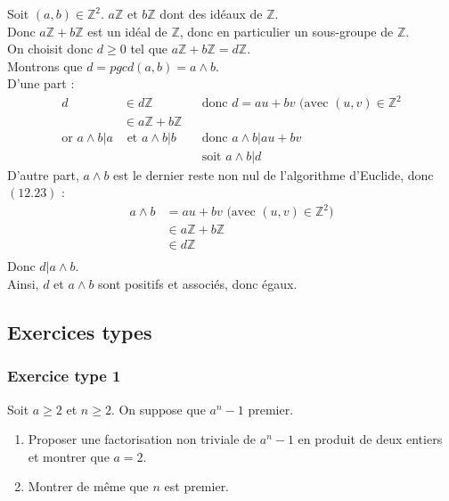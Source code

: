 \documentclass[titlepage, twoside]{report}
\begin{document}
\noindent Soit $(a,b) \in \mathbb{Z}^2$. $a \mathbb{Z} \text{ et } b \mathbb{Z}$ dont des idéaux de $\mathbb{Z}$. \\
Donc $a \mathbb{Z} + b \mathbb{Z}$ est un idéal de $\mathbb{Z}$, donc en particulier un sous-groupe de $\mathbb{Z}$. \\
On choisit donc $d \geq 0$ tel que $a \mathbb{Z} + b \mathbb{Z} = d \mathbb{Z}$. \\
Montrons que $d = pgcd(a,b) = a \wedge b$. \\
D'une part : 
\begin{align*}
    d &\in d \mathbb{Z} && \text{donc } d = au + bv \text{ (avec $(u, v) \in \mathbb{Z}^2$} \\
    &\in a \mathbb{Z} + b \mathbb{Z} \\
    \text{or } a \wedge b | a &\text{ et } a \wedge b | b && \text{donc } a \wedge b | au + bv \\
    & && \text{soit } a \wedge b | d
\end{align*}
D'autre part, $a \wedge b$ est le dernier reste non nul de l'algorithme d'Euclide, donc $(\text{12.23})$ :
\begin{align*}
    a \wedge b &= au + bv \text{ (avec $(u, v) \in \mathbb{Z}^2$)} \\
    &\in a \mathbb{Z} + b \mathbb{Z} \\
    &\in d \mathbb{Z} \\
\end{align*}
Donc $d | a \wedge b$. \\
Ainsi, $d$ et $a \wedge b$ sont positifs et associés, donc égaux.


\subsection{Exercices types}
\subsubsection{Exercice type 1}
\begin{tcolorbox}[title=Exercice 1, title filled=false, colframe=darkgreen, colback=darkgreen!10!white]
    Soit $a \geq 2$ et $n \geq 2$. On suppose que $a^n-1$ premier.
    \begin{enumerate}
        \item Proposer une factorisation non triviale de $a^n-1$ en produit de deux entiers et montrer que $a=2$.
        \item Montrer de même que $n$ est premier.
    \end{enumerate}
\end{tcolorbox}
\end{document}
